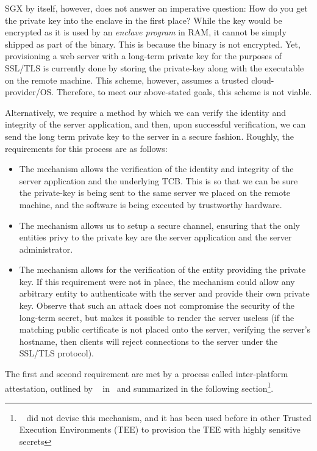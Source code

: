 \documentclass[../main.tex]{subfiles}
\begin{document}
SGX by itself, however, does not answer an imperative question: How do
you get the private key into the enclave in the first place? While the
key would be encrypted as it is used by an \textit{enclave program} in
RAM, it cannot be simply shipped as part of the binary. This is
because the binary is not encrypted. Yet, provisioning a web server
with a long-term private key for the purposes of SSL/TLS is currently
done by storing the private-key along with the executable on the
remote machine. This scheme, however, assumes a trusted
cloud-provider/OS. Therefore, to meet our above-stated goals,
this scheme is not viable.

Alternatively, we require a method by which we can verify the identity
and integrity of the server application, and then, upon successful
verification, we can send the long term private key to the server in a
secure fashion. Roughly, the requirements for this process are as
follows:
\begin{itemize}
  \item The mechanism allows the verification of the identity and
    integrity of the server application and the underlying TCB.  This is
    so that we can be sure the private-key is being sent to the same
    server we placed on the remote machine, and the software is being
    executed by trustworthy hardware.
  \item The mechanism allows us to setup a secure channel, ensuring that
    the only entities privy to the private key are the server
    application and the server administrator.
  \item The mechanism allows for the verification of the entity
    providing the private key. If this requirement were not in place,
    the mechanism could allow any arbitrary entity to authenticate with
    the server and provide their own private key. Observe that such an
    attack does not compromise the security of the long-term secret, but
    makes it possible to render the server useless (if the matching
    public certificate is not placed onto the server, verifying the
    server's hostname, then clients will reject connections to the
    server under the SSL/TLS protocol). %
\end{itemize}
The first and second requirement are met by a process called
inter-platform attestation, outlined by \Intel~
in~\cite{IntelCorporation2010} and summarized in the following
section\footnote{\Intel~ did not devise this mechanism, and it has been
used before in other Trusted Execution Environments (TEE) to
provision the TEE with highly sensitive secrets}.
\end{document}
